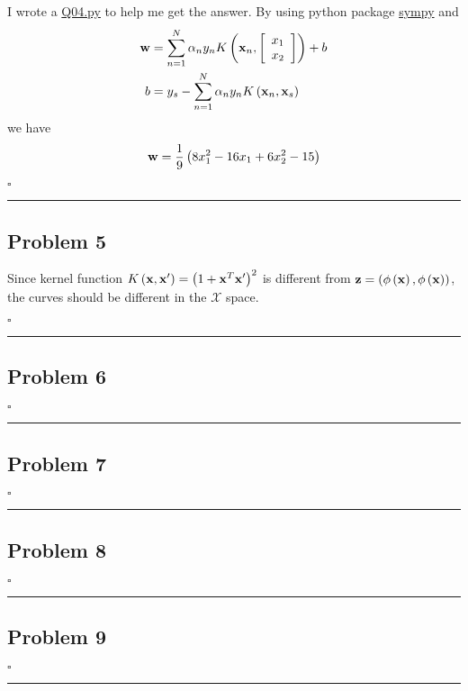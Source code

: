 \documentclass[12pt]{article}
\newcommand*{\QEDB}{\hfill\ensuremath{\square}}
\newcommand{\SBrackets}[1]{\left[#1\right]}
\newcommand{\ParTh}[1]{\left(#1\right)}
\newcommand{\BF}[1]{{\bf#1}}
\newcommand{\Matrix}[2]{\SBrackets{\begin{array}{#1}#2\end{array}}}
\newcommand{\horrule}[1]{\rule{\linewidth}{#1}}
\begin{document}
I wrote a \url{Q04.py} to help me get the answer. By using python package \url{sympy} and
\begin{align}
\BF{w}&=\sum_{n=1}^{N}\alpha_ny_nK\ParTh{\BF{x}_n,\Matrix{c}{x_1\\x_2}}+b\\
b&=y_s-\sum_{n=1}^{N}\alpha_ny_nK\ParTh{\BF{x}_n,\BF{x}_s}
\end{align}
we have
\begin{align}
\BF{w}=\dfrac{1}{9}\ParTh{8x^2_1 - 16x_1 + 6x^2_2-15}
\end{align}

\QEDB

\horrule{0.5pt}

\subsection*{Problem 5}

Since kernel function $K\ParTh{\BF{x},\BF{x}^\prime}=\ParTh{1+\BF{x}^T\BF{x}^\prime}^2$ is different from $\BF{z}=\ParTh{\phi\ParTh{\BF{x}},\phi\ParTh{\BF{x}}}$, the curves should be different in the $\mathcal{X}$ space.

\QEDB

\horrule{0.5pt}

\subsection*{Problem 6}

\QEDB

\horrule{0.5pt}

\subsection*{Problem 7}

\QEDB

\horrule{0.5pt}

\subsection*{Problem 8}

\QEDB

\horrule{0.5pt}

\subsection*{Problem 9}

\QEDB

\horrule{0.5pt}
\end{document}

